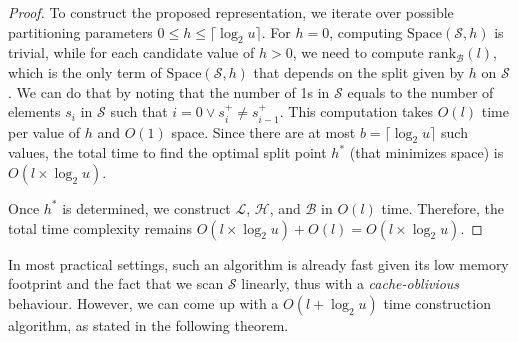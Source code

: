 \begin{proof}
    To construct the proposed representation, we iterate over possible partitioning parameters $0 \leq h \leq \lceil \log_2 u \rceil$. For $h = 0$, computing $\mathrm{Space}(\mathcal S, h)$ is trivial, while for each candidate value of $h > 0$, we need to compute $\mathrm{rank}_{\mathcal B}(l)$, which is the only term of $\mathrm{Space}(\mathcal S, h)$ that depends on the split given by $h$ on $\mathcal S$. We can do that by noting that the number of 1s in $\mathcal S$ equals to the number of elements $s_i$ in $\mathcal S$ such that $i = 0 \lor s_i^+ \ne s_{i -1}^+$. This computation takes $O(l)$ time per value of $h$ and $O(1)$ space. Since there are at most $b= \lceil \log_2 u \rceil$ such values, the total time to find the optimal split point $h^*$ (that minimizes space) is $O(l \times \log_2 u)$.

    Once $h^*$ is determined, we construct $\mathcal L$, $\mathcal H$, and $\mathcal B$ in $O(l)$ time. Therefore, the total time complexity remains $ O(l \times \log_2 u) + O(l) = O(l \times \log_2 u) $.
\end{proof}


In most practical settings, such an algorithm is already fast given its low memory footprint and the fact that we scan $\mathcal S$ linearly, thus with a \emph{cache-oblivious} behaviour. However, we can come up with a $O(l + \log_2 u)$ time construction algorithm, as stated in the following theorem.

